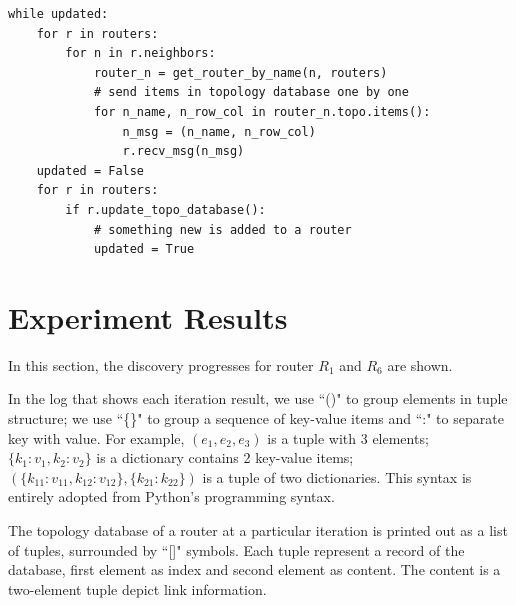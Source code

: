 \documentclass[12pt]{article}  %
\theoremstyle{definition}
\theoremstyle{remark}
\begin{document}
\begin{lstlisting}
while updated:
    for r in routers:
        for n in r.neighbors:
            router_n = get_router_by_name(n, routers)
            # send items in topology database one by one
            for n_name, n_row_col in router_n.topo.items():
                n_msg = (n_name, n_row_col)
                r.recv_msg(n_msg)
    updated = False
    for r in routers:
        if r.update_topo_database():
            # something new is added to a router
            updated = True
\end{lstlisting}

\section{Experiment Results}
In this section, the discovery progresses for router $R_1$ and $R_6$ are shown.

In the log that shows each iteration result, we use ``()" to group elements in tuple structure;
we use ``\{\}" to group a sequence of key-value items and ``:" to separate key with value.
For example, $(e_1, e_2, e_3)$ is a tuple with 3 elements;
$\{k_1:v_1, k_2:v_2\}$ is a dictionary contains 2 key-value items;
$(\{k_{11}:v_{11}, k_{12}:v_{12}\},\{k_{21}:k_{22}\})$ is a tuple of two dictionaries.
This syntax is entirely adopted from Python's programming syntax.

The topology database of a router at a particular iteration is printed out as a list of tuples, surrounded by ``[]" symbols.
Each tuple represent a record of the database, first element as index and second element as content.
The content is a two-element tuple depict link information.
\end{document}
